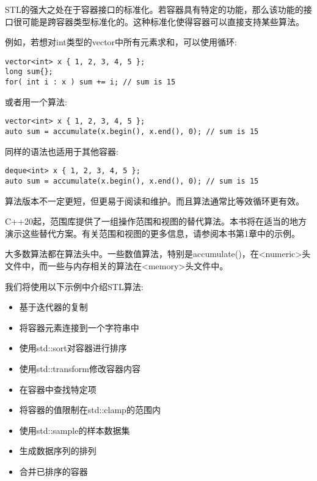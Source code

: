 STL的强大之处在于容器接口的标准化。若容器具有特定的功能，那么该功能的接口很可能是跨容器类型标准化的。这种标准化使得容器可以直接支持某些算法。

例如，若想对int类型的vector中所有元素求和，可以使用循环:

\begin{lstlisting}[style=styleCXX]
vector<int> x { 1, 2, 3, 4, 5 };
long sum{};
for( int i : x ) sum += i; // sum is 15
\end{lstlisting}

或者用一个算法:

\begin{lstlisting}[style=styleCXX]
vector<int> x { 1, 2, 3, 4, 5 };
auto sum = accumulate(x.begin(), x.end(), 0); // sum is 15
\end{lstlisting}

同样的语法也适用于其他容器:

\begin{lstlisting}[style=styleCXX]
deque<int> x { 1, 2, 3, 4, 5 };
auto sum = accumulate(x.begin(), x.end(), 0); // sum is 15
\end{lstlisting}

算法版本不一定更短，但更易于阅读和维护。而且算法通常比等效循环更有效。

C++20起，范围库提供了一组操作范围和视图的替代算法。本书将在适当的地方演示这些替代方案。有关范围和视图的更多信息，请参阅本书第1章中的示例。

大多数算法都在算法头中。一些数值算法，特别是accumulate()，在<numeric>头文件中，而一些与内存相关的算法在<memory>头文件中。

我们将使用以下示例中介绍STL算法:

\begin{itemize}
\item 
基于迭代器的复制

\item 
将容器元素连接到一个字符串中

\item 
使用std::sort对容器进行排序

\item 
使用std::transform修改容器内容

\item 
在容器中查找特定项

\item 
将容器的值限制在std::clamp的范围内

\item 
使用std::sample的样本数据集

\item 
生成数据序列的排列

\item 
合并已排序的容器
\end{itemize}













